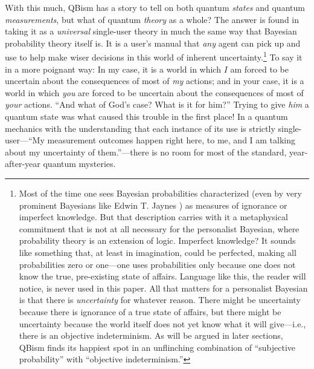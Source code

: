 \documentclass[aps,pra,superscriptaddress,12pt,tightenlines,nofootinbib]{revtex4-2}
\begin{document}
With this much, QBism has a story to tell on both quantum {\it states\/} and quantum {\it measurements}, but what of quantum {\it theory\/} as a whole?  The answer is found in taking it as a {\it universal\/} single-user theory in much the same way that Bayesian probability theory itself is.  It is a user's manual that {\it any\/} agent can pick up and use to help make wiser decisions in this world of inherent uncertainty.\footnote{\label{Macca} Most of the time one sees Bayesian probabilities characterized (even by very prominent Bayesians like Edwin T. Jaynes \cite{Jaynes03}) as measures of ignorance or imperfect knowledge.  But that description carries with it a metaphysical commitment that is not at all necessary for the personalist Bayesian, where probability theory is an extension of logic.  Imperfect knowledge?  It sounds like something that, at least in imagination, could be perfected, making all probabilities zero or one---one uses probabilities only because one does not know the true, pre-existing state of affairs.  Language like this, the reader will notice, is never used in this paper.  All that matters for a personalist Bayesian is that there is {\it uncertainty\/} for whatever reason.  There might be uncertainty because there is ignorance of a true state of affairs, but there might be uncertainty because the world itself does not yet know what it will give---i.e., there is an objective indeterminism.  As will be argued in later sections, QBism finds its happiest spot in an unflinching combination of ``subjective probability'' with ``objective indeterminism.''}  To say it in a more poignant way:  In my case, it is a world in which $I$ am forced to be uncertain about the consequences of most of {\it my\/} actions; and in your case, it is a world in which {\it you\/} are forced to be uncertain about the consequences of most of {\it your\/} actions.  ``And what of God's case?  What is it for him?''  Trying to give {\it him\/} a quantum state was what caused this trouble in the first place!  In a quantum mechanics with the understanding that each instance of its use is strictly single-user---``My measurement outcomes happen right here, to me, and I am talking about my uncertainty of them.''---there is no room for most of the standard, year-after-year quantum mysteries.
\end{document}
